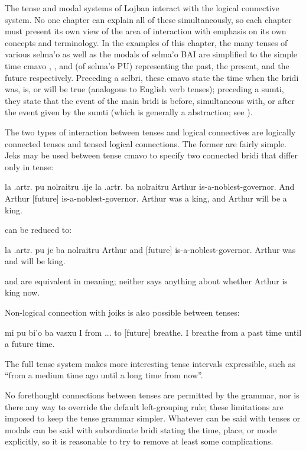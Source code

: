 The tense and modal systems of Lojban interact with the
    logical connective system. No one chapter can explain all of
    these simultaneously, so each chapter must present its own view
    of the area of interaction with emphasis on its own concepts
    and terminology. In the examples of this chapter, the many
    tenses of various selma'o as well as the modals of selma'o BAI
    are simplified to the simple time cmavo , , and
     (of selma'o PU) representing the past, the present, and
    the future respectively. Preceding a selbri, these cmavo state
    the time when the bridi was, is, or will be true (analogous to
    English verb tenses); preceding a sumti, they state that the
    event of the main bridi is before, simultaneous with, or after
    the event given by the sumti (which is generally a 
    abstraction; see ).

The two types of interaction between tenses and logical
    connectives are logically connected tenses and tensed logical
    connections. The former are fairly simple. Jeks may be used
    between tense cmavo to specify two connected bridi that differ
    only in tense:
\begin{example}
la .artr. pu nolraitru\n
\T	.ije la .artr. ba nolraitru\n
Arthur  is-a-noblest-governor.\n
\T	And Arthur [future] is-a-noblest-governor.\n
Arthur was a king, and Arthur will be a king.
\end{example}

{\noindent}can be reduced to:
\begin{example}
la .artr. pu je ba nolraitru\n
Arthur  and [future] is-a-noblest-governor.\n
Arthur was and will be king.
\end{example}

 and  are equivalent in meaning; neither says anything about
    whether Arthur is king now. 

Non-logical connection with joiks is also possible between
    tenses:
\begin{example}
mi pu bi'o ba vasxu\n
I  from ... to [future] breathe.\n
I breathe from a past time until a future time.
\end{example}

The full tense system makes more interesting tense intervals
    expressible, such as ``from a medium time ago until a long time
    from now''.

No forethought connections between tenses are permitted by
    the grammar, nor is there any way to override the default
    left-grouping rule; these limitations are imposed to keep the
    tense grammar simpler. Whatever can be said with tenses or
    modals can be said with subordinate bridi stating the time,
    place, or mode explicitly, so it is reasonable to try to remove
    at least some complications.

